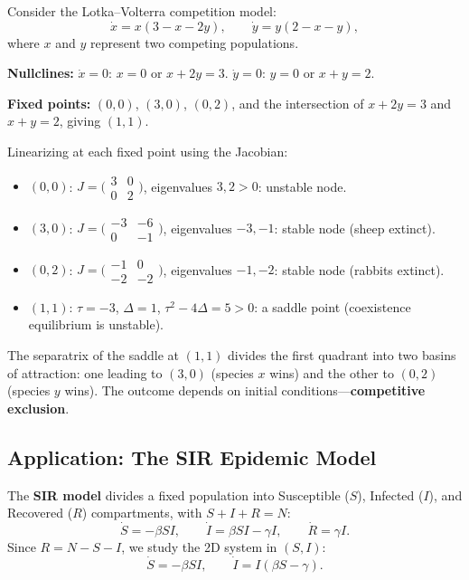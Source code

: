 \documentclass[11pt,letterpaper]{article}
\theoremstyle{definition}
\theoremstyle{plain}
\theoremstyle{remark}
\begin{document}
Consider the Lotka--Volterra competition model:
\begin{equation}
  \dot{x} = x(3-x-2y), \qquad \dot{y} = y(2-x-y),
\end{equation}
where $x$ and $y$ represent two competing populations.

\textbf{Nullclines:}
$\dot{x}=0$: $x=0$ or $x+2y=3$.  $\dot{y}=0$: $y=0$ or $x+y=2$.

\textbf{Fixed points:} $(0,0)$, $(3,0)$, $(0,2)$, and the intersection of
$x+2y=3$ and $x+y=2$, giving $(1,1)$.

Linearizing at each fixed point using the Jacobian:
\begin{itemize}[leftmargin=2em]
\item $(0,0)$: $J = \bigl(\begin{smallmatrix} 3&0\\0&2\end{smallmatrix}\bigr)$,
      eigenvalues $3,2 > 0$: unstable node.
\item $(3,0)$: $J = \bigl(\begin{smallmatrix} -3&-6\\0&-1\end{smallmatrix}\bigr)$,
      eigenvalues $-3,-1$: stable node (sheep extinct).
\item $(0,2)$: $J = \bigl(\begin{smallmatrix} -1&0\\-2&-2\end{smallmatrix}\bigr)$,
      eigenvalues $-1,-2$: stable node (rabbits extinct).
\item $(1,1)$: $\tau = -3$, $\Delta = 1$, $\tau^2-4\Delta = 5 > 0$:
      a saddle point (coexistence equilibrium is unstable).
\end{itemize}

The separatrix of the saddle at $(1,1)$ divides the first quadrant into two
basins of attraction: one leading to $(3,0)$ (species $x$ wins) and the
other to $(0,2)$ (species $y$ wins).  The outcome depends on initial conditions---\textbf{competitive exclusion}.

\subsection{Application: The SIR Epidemic Model}

The \textbf{SIR model} divides a fixed population into Susceptible ($S$),
Infected ($I$), and Recovered ($R$) compartments, with $S+I+R=N$:
\begin{equation}
  \dot{S} = -\beta SI, \qquad \dot{I} = \beta SI - \gamma I,
  \qquad \dot{R} = \gamma I.
\end{equation}
Since $R = N - S - I$, we study the 2D system in $(S,I)$:
\begin{equation}
  \dot{S} = -\beta SI, \qquad \dot{I} = I(\beta S - \gamma).
\end{equation}
\end{document}
